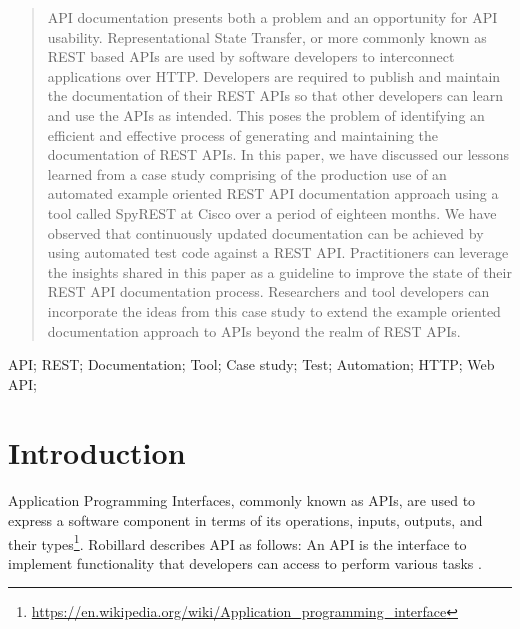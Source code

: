 \documentclass[10pt, conference]{IEEEtran}
\begin{document}




\maketitle


\begin{abstract}
API documentation presents both a problem and an opportunity for API usability. Representational State Transfer, or more commonly known as REST based APIs are used by software developers to interconnect applications over HTTP. Developers are required to publish and maintain the documentation of their REST APIs so that other developers can learn and use the APIs as intended. This poses the problem of identifying an efficient and effective process of generating and maintaining the documentation of REST APIs. In this paper, we have discussed our lessons learned from a case study comprising of the production use of an automated example oriented REST API documentation approach using a tool called SpyREST at Cisco over a period of eighteen months. We have observed that continuously updated documentation can be achieved by using automated test code against a REST API. Practitioners can leverage the insights shared in this paper as a guideline to improve the state of their REST API documentation process. Researchers and tool developers can incorporate the ideas from this case study to extend the example oriented documentation approach to APIs beyond the realm of REST APIs.

\end{abstract}

\begin{IEEEkeywords}
API; REST; Documentation; Tool; Case study; Test; Automation; HTTP; Web API;

\end{IEEEkeywords}


%
\IEEEpeerreviewmaketitle

\section{Introduction}
Application Programming Interfaces, commonly known as APIs, are used to express a software component in terms of its operations, inputs, outputs, and their types\footnote{\url{https://en.wikipedia.org/wiki/Application_programming_interface}}. Robillard describes API as follows: An API is the interface to implement functionality that developers can access to perform various tasks \cite{Robillard_a_field_study} \cite{Robillard_what_makes}.
\end{document}
